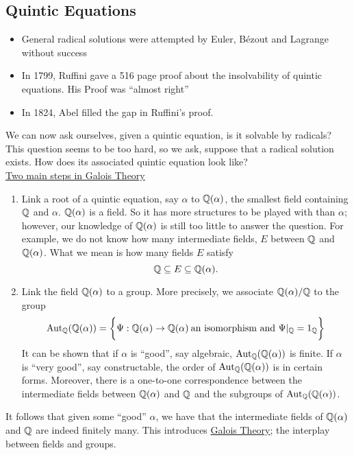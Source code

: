 \documentclass[11pt]{article}
\begin{document}
\subsection{Quintic Equations}
\begin{itemize}
\item General radical solutions were attempted by Euler, B\'ezout and Lagrange without
success
\item In 1799, Ruffini gave a 516 page proof about the insolvability of quintic
equations. His Proof was ``almost right''
\item In 1824, Abel filled the gap in Ruffini's proof.
\end{itemize}
We can now ask ourselves, given a quintic equation, is it solvable by radicals?
This question seems to be too hard, so we ask, suppose that a radical solution
exists. How does its associated quintic equation look like?\\

\underline{Two main steps in Galois Theory}
\begin{enumerate}
\item Link a root of a quintic equation, say $\alpha$ to $\mathbb{Q}(\alpha)$, the
smallest field containing $\mathbb{Q}$ and $\alpha$. $\mathbb{Q}(\alpha)$ is a field. So it has
more structures to be played with than $\alpha$; however, our knowledge of
$\mathbb{Q}(\alpha)$ is still too little to answer the question. For example, we do not
know how many intermediate fields, $E$ between $\mathbb{Q}$ and $\mathbb{Q}(\alpha)$.
What we mean is how many fields $E$ satisfy
\begin{equation*}
\mathbb{Q} \subseteq E \subseteq \mathbb{Q}(\alpha).
\end{equation*}
\item Link the field $\mathbb{Q}(\alpha)$ to a group. More precisely, we associate
$\mathbb{Q}(\alpha)/\mathbb{Q}$ to the group
\begin{equation*}
\operatorname{Aut}_{\mathbb{Q}} (\mathbb{Q}(\alpha)) = \bigg\{\Psi : \mathbb{Q}(\alpha) \to \mathbb{Q}(\alpha)\>\text{an
isomorphism and } \Psi|_{\mathbb{Q}} = 1_{\mathbb{Q}}\bigg\}
\end{equation*}
It can be shown that if $\alpha$ is ``good'', say algebraic, $\operatorname{Aut}_{\mathbb{Q}}
(\mathbb{Q}(\alpha))$ is finite. If $\alpha$ is ``very good'', say constructable, the order
of $\operatorname{Aut}_{\mathbb{Q}} (\mathbb{Q}(\alpha))$ is in certain forms. Moreover, there is a one-to-one
correspondence between the intermediate fields between $\mathbb{Q}(\alpha)$ and
$\mathbb{Q}$ and the subgroups of $\operatorname{Aut}_{\mathbb{Q}} (\mathbb{Q}(\alpha))$. \\
\end{enumerate}

It follows that given some ``good'' $\alpha$, we have that the
intermediate fields of $\mathbb{Q}(\alpha)$ and $\mathbb{Q}$ are indeed finitely many. This
introduces \underline{Galois Theory}; the interplay between fields and groups.
\end{document}
